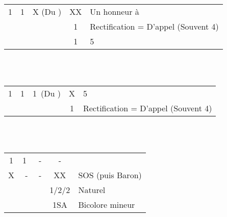 \documentclass[a4paper, oneside, 11pt]{report}
\begin{document}
	\begin{tabular}{cccc|l}
	1\trefle & 1\carreau & X (Du \coeur) & XX & Un honneur à \carreau\\
	&&& 1\coeur & Rectification = D'appel (Souvent 4\pique)\\
	&&& 1\pique & 5\pique\\
	\end{tabular}\\\\

	\begin{tabular}{cccc|l}
	1\trefle & 1\carreau & 1\coeur\ (Du \pique) & X & 5\coeur\\
	&&& 1\pique & Rectification = D'appel (Souvent 4\coeur)\\
	\end{tabular}\\\\

	\begin{tabular}{cccc|l}
	1\trefle & 1\coeur\  & - & - &\\
	X & - & - & XX & SOS (puis Baron)\\
	&&& 1\pique/2\trefle/2\carreau & Naturel\\
	&&& 1SA & Bicolore mineur\\
	\end{tabular}\\\\
\end{document}
